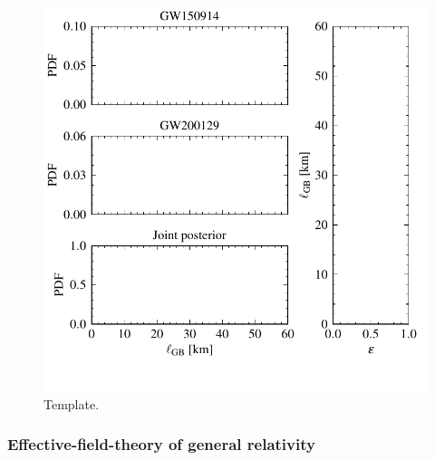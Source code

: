 \documentclass[twocolumn,prd,aps,superscriptaddress,preprintnumbers,tightenlines,showpacs,nofootinbib,eqsecnum,amsfonts,amsmath,longbibliography]{revtex4-1}
\begin{document}
\begin{figure}[t]
\includegraphics[width=\columnwidth]{figs/ssgb_posteriors.pdf}
\caption{Template.}
\label{fig:sGB_exec_sum}
\end{figure}


\subsubsection{Effective-field-theory of general relativity}
\label{sec:results_efts}
\end{document}
